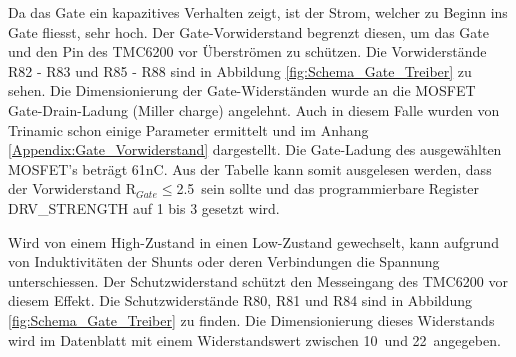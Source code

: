 

Da das Gate ein kapazitives Verhalten zeigt, ist der Strom, welcher zu Beginn ins Gate fliesst, sehr hoch. Der Gate-Vorwiderstand begrenzt diesen, um das Gate und den Pin des TMC6200 vor Überströmen zu schützen. Die Vorwiderstände R82 - R83 und R85 - R88 sind in Abbildung \ref{fig:Schema_Gate_Treiber} zu sehen.
Die Dimensionierung der Gate-Widerständen wurde an die MOSFET Gate-Drain-Ladung (Miller charge) angelehnt. Auch in diesem Falle wurden von Trinamic schon einige Parameter ermittelt und im Anhang \ref{Appendix:Gate_Vorwiderstand} dargestellt. Die Gate-Ladung des ausgewählten MOSFET's beträgt 61nC. Aus der Tabelle kann somit ausgelesen werden, dass der Vorwiderstand R$_{Gate}\leq$2.5\textOmega\ sein sollte und das programmierbare Register DRV\_STRENGTH auf 1 bis 3 gesetzt wird. \cite[S.13]{trinamicmotion_control_gmbh__co_kg_tmc6200_2019}



Wird von einem High-Zustand in einen Low-Zustand gewechselt, kann aufgrund von Induktivitäten der Shunts oder deren Verbindungen die Spannung unterschiessen. Der Schutzwiderstand schützt den Messeingang des TMC6200 vor diesem Effekt. Die Schutzwiderstände R80, R81 und R84 sind in Abbildung \ref{fig:Schema_Gate_Treiber} zu finden.
Die Dimensionierung dieses Widerstands wird im Datenblatt mit einem Widerstandswert zwischen 10\textOmega\ und 22\textOmega\ angegeben.\cite[S.10]{trinamicmotion_control_gmbh__co_kg_tmc6200_2019}

